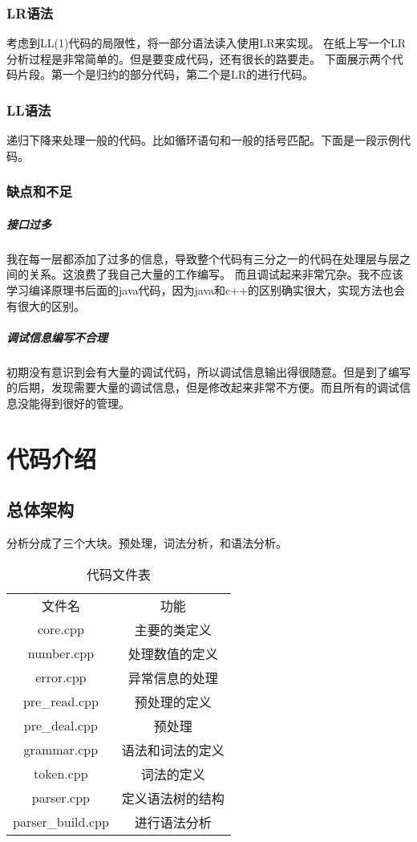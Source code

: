 \documentclass[12pt,a4paper]{ctexrep}
\begin{document}
\subsection{LR语法}
考虑到LL(1)代码的局限性，将一部分语法读入使用LR来实现。
在纸上写一个LR分析过程是非常简单的。但是要变成代码，还有很长的路要走。
下面展示两个代码片段。第一个是归约的部分代码，第二个是LR的进行代码。


\subsection{LL语法}
递归下降来处理一般的代码。比如循环语句和一般的括号匹配。下面是一段示例代码。

\subsection{缺点和不足}
\paragraph{接口过多}
我在每一层都添加了过多的信息，导致整个代码有三分之一的代码在处理层与层之间的关系。这浪费了我自己大量的工作编写。
而且调试起来非常冗杂。我不应该学习编译原理书后面的java代码，因为java和c++的区别确实很大，实现方法也会有很大的区别。
\paragraph{调试信息编写不合理}
初期没有意识到会有大量的调试代码，所以调试信息输出得很随意。但是到了编写的后期，发现需要大量的调试信息，但是修改起来非常不方便。而且所有的调试信息没能得到很好的管理。
\chapter{代码介绍}
\section{总体架构}
分析分成了三个大块。预处理，词法分析，和语法分析。
\begin{table}[h]
\caption{代码文件表}

\centering
\begin{tabular}[h]{|c|c|}
\hline
文件名 & 功能 \\
core.cpp	&  主要的类定义 \\
number.cpp	& 处理数值的定义\\
error.cpp	& 异常信息的处理 \\
pre\_read.cpp & 预处理的定义 \\
pre\_deal.cpp & 预处理 \\
grammar.cpp & 语法和词法的定义 \\
token.cpp	& 词法的定义 \\
parser.cpp & 定义语法树的结构 \\
parser\_build.cpp & 进行语法分析 \\
\hline

\end{tabular}
\end{table}
\end{document}
